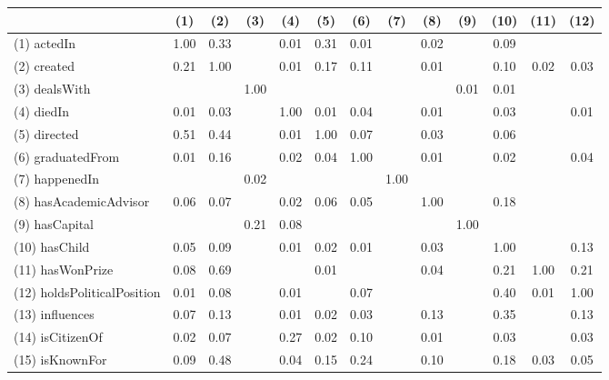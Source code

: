 \begin{table}[t]
    \begin{center}
        \scriptsize
        \begin{tabular}{l||*{12}{c}}
       & (1) & (2) & (3) & (4) & (5) & (6) & (7) & (8) & (9) & (10) & (11) & (12) \\
            \hline
            (1) actedIn  & 1.00  & 0.33  &    & 0.01  & 0.31  & 0.01  &    & 0.02  &    & 0.09  &    &   \\
            (2) created  & 0.21  & 1.00  &    & 0.01  & 0.17  & 0.11  &    & 0.01  &    & 0.10  & 0.02  & 0.03 \\
            (3) dealsWith  &    &    & 1.00  &    &    &    &    &    & 0.01  & 0.01  &    &   \\
            (4) diedIn  & 0.01  & 0.03  &    & 1.00  & 0.01  & 0.04  &    & 0.01  &    & 0.03  &    & 0.01 \\
            (5) directed  & 0.51  & 0.44  &    & 0.01  & 1.00  & 0.07  &    & 0.03  &    & 0.06  &    &   \\
            (6) graduatedFrom  & 0.01  & 0.16  &    & 0.02  & 0.04  & 1.00  &    & 0.01  &    & 0.02  &    & 0.04 \\
            (7) happenedIn  &    &    & 0.02  &    &    &    & 1.00  &    &    &    &    &   \\
            (8) hasAcademicAdvisor  & 0.06  & 0.07  &    & 0.02  & 0.06  & 0.05  &    & 1.00  &    & 0.18  &    &   \\
            (9) hasCapital  &    &    & 0.21  & 0.08  &    &    &    &    & 1.00  &    &    &   \\
            (10) hasChild  & 0.05  & 0.09  &    & 0.01  & 0.02  & 0.01  &    & 0.03  &    & 1.00  &    & 0.13 \\
            (11) hasWonPrize  & 0.08  & 0.69  &    &    & 0.01  &    &    & 0.04  &    & 0.21  & 1.00  & 0.21 \\
            (12) holdsPoliticalPosition  & 0.01  & 0.08  &    & 0.01  &    & 0.07  &    &    &    & 0.40  & 0.01  & 1.00 \\
            (13) influences  & 0.07  & 0.13  &    & 0.01  & 0.02  & 0.03  &    & 0.13  &    & 0.35  &    & 0.13 \\
            (14) isCitizenOf  & 0.02  & 0.07  &    & 0.27  & 0.02  & 0.10  &    & 0.01  &    & 0.03  &    & 0.03 \\
            (15) isKnownFor  & 0.09  & 0.48  &    & 0.04  & 0.15  & 0.24  &    & 0.10  &    & 0.18  & 0.03  & 0.05 \\

\end{tabular}
\end{center}
\end{table}
